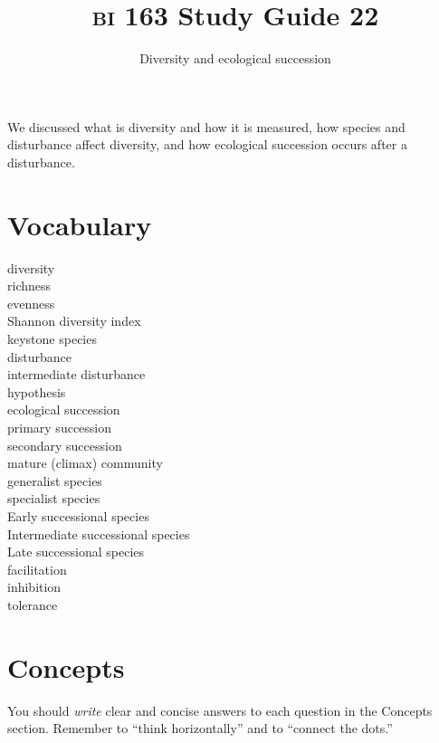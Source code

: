 \documentclass[letterpaper]{tufte-handout}
\title{{\scshape bi} 163 Study Guide 22}
\author{Diversity and ecological succession}
\date{} %
\begin{document}
\maketitle	%

We discussed what is diversity and how it is measured, how species and disturbance affect diversity, and how ecological succession occurs after a disturbance.

\section*{Vocabulary}

\vspace{-1\baselineskip}
\begin{multicols}{2}
diversity \\
richness \\
evenness \\
Shannon diversity index \\
keystone species \\
disturbance \\
intermediate disturbance\\ \hspace*{1em} hypothesis \\
ecological succession \\
primary succession \\
secondary succession \\
mature (climax) community \\
generalist species \\
specialist species \\
Early successional species \\
Intermediate successional species \\
Late successional species \\
facilitation \\
inhibition \\
tolerance
\end{multicols}

\section*{Concepts}

You should \emph{write} clear and concise answers to each question in the Concepts section.  Remember to ``think horizontally'' and to ``connect the dots.'' 
\end{document}
